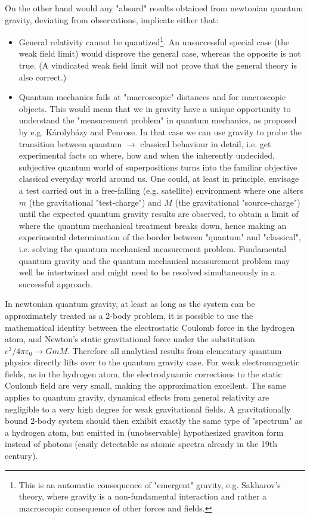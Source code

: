 	On the other hand would any "absurd" results obtained from	newtonian quantum gravity, deviating from observations, implicate	either that:
	\begin{itemize}
		\item General relativity cannot be quantized\footnote{This is an automatic consequence of "emergent" gravity, e.g. Sakharov's 	theory, where gravity is a non-fundamental interaction and rather a macroscopic consequence of other forces and fields.}. An unsuccessful special case (the weak field limit) would disprove the general case, whereas the opposite is not true. (A vindicated weak field limit will not prove that the general theory is also correct.)
	
		\item Quantum mechanics fails at "macroscopic" distances and for macroscopic objects. This would mean that we in gravity have a unique opportunity to understand the "measurement problem" in quantum mechanics, as proposed by e.g. K\'{a}rolyh\'{a}zy and Penrose. In that case we can use gravity to probe the transition between quantum $\rightarrow$ classical behaviour in detail, i.e. get experimental facts on where, how and when the inherently undecided, subjective quantum world of superpositions turns into the familiar objective classical everyday world around us. One could, at least in principle, envisage a test carried out in a free-falling (e.g.	satellite) environment where one alters $m$ (the gravitational "test-charge") and $M$ (the gravitational "source-charge") until	the expected quantum gravity results are observed, to obtain a limit of where the quantum mechanical treatment breaks down, hence making an experimental determination of the border between "quantum" and "classical", i.e. solving the quantum mechanical measurement problem. Fundamental quantum gravity and the quantum mechanical measurement problem may well be intertwined and might need to be resolved simultaneously in a successful approach.
	\end{itemize}
	
	In newtonian quantum gravity, at least as long as the system can be approximately treated as a 2-body problem, it is possible to use the mathematical identity between the electrostatic Coulomb	force in the hydrogen atom, and Newton's static gravitational force under the substitution $e^2 / 4 \pi \varepsilon_0 \rightarrow GmM$. Therefore all analytical results from elementary quantum physics directly lifts over to the quantum gravity case. For weak electromagnetic fields, as in the hydrogen atom, the electrodynamic corrections to the static Coulomb field are very small, making the approximation excellent. The same applies to quantum gravity, dynamical effects from general relativity are negligible to a very high degree for weak gravitational fields. A gravitationally bound 2-body system should then exhibit exactly the same type of "spectrum" as a hydrogen atom, but emitted in (unobservable) hypothesized graviton form instead of photons (easily detectable as atomic spectra already in the 19th century).
	
